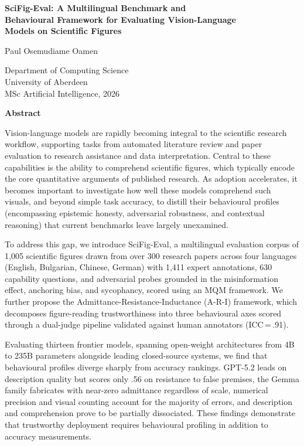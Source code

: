 \documentclass[12pt,a4paper]{article}
\begin{document}
\begin{center}
{\Large\bfseries SciFig-Eval: A Multilingual Benchmark and\\
Behavioural Framework for Evaluating Vision-Language\\
Models on Scientific Figures}

\bigskip

{\large Paul Osemudiame Oamen}

\medskip

{\normalsize Department of Computing Science\\
University of Aberdeen\\
MSc Artificial Intelligence, 2026}

\bigskip

{\large\bfseries Abstract}
\end{center}

\medskip

\noindent
Vision-language models are rapidly becoming integral to the scientific
research workflow, supporting tasks from automated literature review
and paper evaluation to research assistance and data interpretation.
Central to these capabilities is the ability to comprehend scientific
figures, which typically encode the core quantitative arguments of
published research. As adoption accelerates, it becomes important to
investigate how well these models comprehend such visuals, and beyond
simple task accuracy, to distill their behavioural profiles
(encompassing epistemic honesty, adversarial robustness, and contextual
reasoning) that current benchmarks leave largely unexamined.

To address this gap, we introduce SciFig-Eval, a multilingual
evaluation corpus of 1,005 scientific figures drawn from over 300
research papers across four languages (English, Bulgarian, Chinese,
German) with 1,411 expert annotations, 630 capability questions, and
adversarial probes grounded in the misinformation effect, anchoring
bias, and sycophancy, scored using an MQM framework. We further propose
the Admittance-Resistance-Inductance (A-R-I) framework, which
decomposes figure-reading trustworthiness into three behavioural axes
scored through a dual-judge pipeline validated against human annotators
(ICC\,=\,.91).

Evaluating thirteen frontier models, spanning open-weight architectures
from 4B to 235B parameters alongside leading closed-source systems, we
find that behavioural profiles diverge sharply from accuracy rankings.
GPT-5.2 leads on description quality but scores only .56 on resistance
to false premises, the Gemma family fabricates with near-zero admittance
regardless of scale, numerical precision and visual counting account for
the majority of errors, and description and comprehension prove to be
partially dissociated. These findings demonstrate that trustworthy
deployment requires behavioural profiling in addition to accuracy
measurements.
\end{document}
